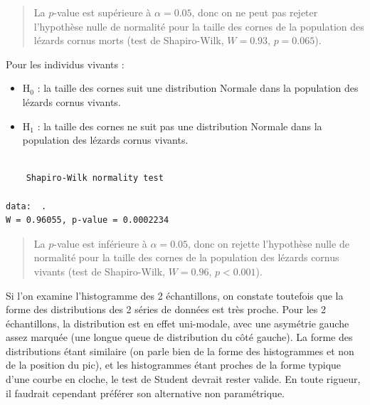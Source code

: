 \documentclass[
  a4paper,
]{article}
\newenvironment{Shaded}{\begin{snugshade}}{\end{snugshade}}
\newcommand{\KeywordTok}[1]{\textcolor[rgb]{0.12,0.11,0.11}{\textbf{#1}}}
\newcommand{\NormalTok}[1]{\textcolor[rgb]{0.12,0.11,0.11}{#1}}
\newcommand{\OperatorTok}[1]{\textcolor[rgb]{0.12,0.11,0.11}{#1}}
\newcommand{\StringTok}[1]{\textcolor[rgb]{0.75,0.01,0.01}{#1}}
\providecommand{\tightlist}{%
  \setlength{\itemsep}{0pt}\setlength{\parskip}{0pt}}
\begin{document}
\begin{quote}
La \(p\)-value est supérieure à \(\alpha = 0.05\), donc on ne peut pas rejeter l'hypothèse nulle de normalité pour la taille des cornes de la population des lézards cornus morts (test de Shapiro-Wilk, \(W = 0.93\), \(p = 0.065\)).
\end{quote}

Pour les individus vivants :

\begin{itemize}
\tightlist
\item
  H\(_0\) : la taille des cornes suit une distribution Normale dans la population des lézards cornus vivants.
\item
  H\(_1\) : la taille des cornes ne suit pas une distribution Normale dans la population des lézards cornus vivants.
\end{itemize}

\begin{Shaded}
\end{Shaded}

\begin{verbatim}

    Shapiro-Wilk normality test

data:  .
W = 0.96055, p-value = 0.0002234
\end{verbatim}

\begin{quote}
La \(p\)-value est inférieure à \(\alpha = 0.05\), donc on rejette l'hypothèse nulle de normalité pour la taille des cornes de la population des lézards cornus vivants (test de Shapiro-Wilk, \(W = 0.96\), \(p < 0.001\)).
\end{quote}

Si l'on examine l'histogramme des 2 échantillons, on constate toutefois que la forme des distributions des 2 séries de données est très proche. Pour les 2 échantillons, la distribution est en effet uni-modale, avec une asymétrie gauche assez marquée (une longue queue de distribution du côté gauche). La forme des distributions étant similaire (on parle bien de la forme des histogrammes et non de la position du pic), et les histogrammes étant proches de la forme typique d'une courbe en cloche, le test de Student devrait rester valide. En toute rigueur, il faudrait cependant préférer son alternative non paramétrique.
\end{document}
